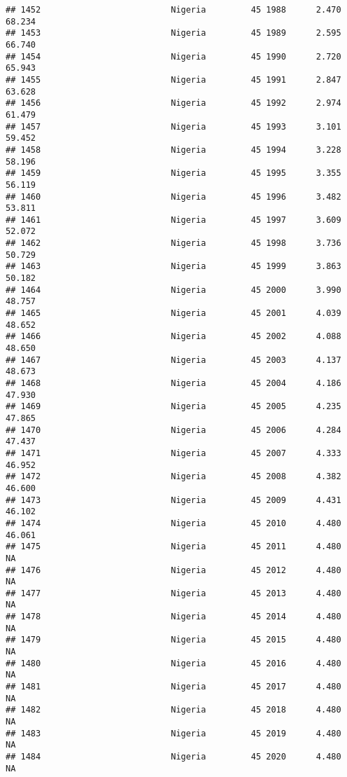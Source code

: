 \documentclass[
]{article}
\begin{document}
\begin{verbatim}
## 1452                          Nigeria         45 1988      2.470     68.234
## 1453                          Nigeria         45 1989      2.595     66.740
## 1454                          Nigeria         45 1990      2.720     65.943
## 1455                          Nigeria         45 1991      2.847     63.628
## 1456                          Nigeria         45 1992      2.974     61.479
## 1457                          Nigeria         45 1993      3.101     59.452
## 1458                          Nigeria         45 1994      3.228     58.196
## 1459                          Nigeria         45 1995      3.355     56.119
## 1460                          Nigeria         45 1996      3.482     53.811
## 1461                          Nigeria         45 1997      3.609     52.072
## 1462                          Nigeria         45 1998      3.736     50.729
## 1463                          Nigeria         45 1999      3.863     50.182
## 1464                          Nigeria         45 2000      3.990     48.757
## 1465                          Nigeria         45 2001      4.039     48.652
## 1466                          Nigeria         45 2002      4.088     48.650
## 1467                          Nigeria         45 2003      4.137     48.673
## 1468                          Nigeria         45 2004      4.186     47.930
## 1469                          Nigeria         45 2005      4.235     47.865
## 1470                          Nigeria         45 2006      4.284     47.437
## 1471                          Nigeria         45 2007      4.333     46.952
## 1472                          Nigeria         45 2008      4.382     46.600
## 1473                          Nigeria         45 2009      4.431     46.102
## 1474                          Nigeria         45 2010      4.480     46.061
## 1475                          Nigeria         45 2011      4.480         NA
## 1476                          Nigeria         45 2012      4.480         NA
## 1477                          Nigeria         45 2013      4.480         NA
## 1478                          Nigeria         45 2014      4.480         NA
## 1479                          Nigeria         45 2015      4.480         NA
## 1480                          Nigeria         45 2016      4.480         NA
## 1481                          Nigeria         45 2017      4.480         NA
## 1482                          Nigeria         45 2018      4.480         NA
## 1483                          Nigeria         45 2019      4.480         NA
## 1484                          Nigeria         45 2020      4.480         NA

\end{verbatim}
\end{document}
